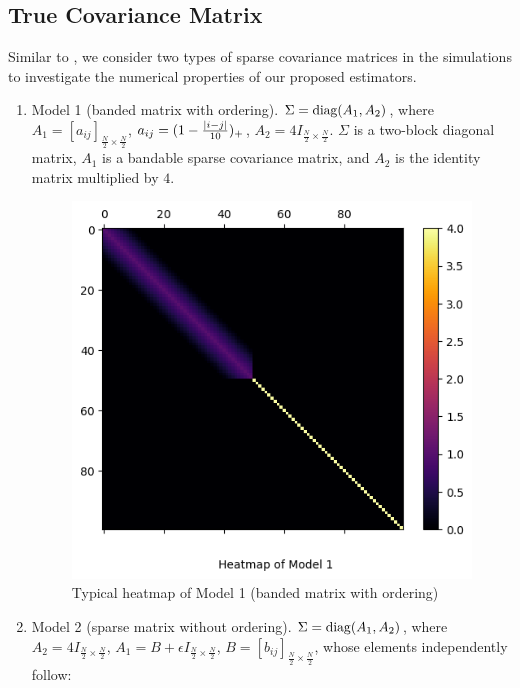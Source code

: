\subsection{True Covariance Matrix}\label{true_cov}
Similar to \cite{cai2011adaptive}, we consider two types of sparse covariance matrices in the simulations to investigate the numerical properties of our proposed estimators. 
\begin{enumerate}
    \item Model 1 (banded matrix with ordering). $\Sigma = \operatorname{diag}(A_1, A_2)$, where $A_1 = [a_{ij}]_{\frac{N}{2} \times \frac{N}{2}}$, $a_{ij} = (1-\frac{\abs{i-j}}{10})_+$, $A_2 = 4 I_{\frac{N}{2} \times \frac{N}{2}}$. $\Sigma$ is a two-block diagonal matrix, $A_1$ is a bandable sparse covariance matrix, and $A_2$ is the identity matrix multiplied by $4$.
    \begin{figure}[H]
        \centering
\includegraphics[scale=0.75]{simulation_result/pic_model1.png}
        \caption{Typical heatmap of Model 1 (banded matrix with ordering)}
        \label{fig:model1}
    \end{figure}
    \item Model 2 (sparse matrix without ordering). $\Sigma = \operatorname{diag}(A_1, A_2)$, where $A_2 = 4 I_{\frac{N}{2} \times \frac{N}{2}}$, $A_1 = B + \epsilon I_{\frac{N}{2} \times \frac{N}{2}}$, $B = [b_{ij}]_{\frac{N}{2} \times \frac{N}{2}}$, whose elements independently follow:
    \begin{equation}

\end{equation}
\end{enumerate}
